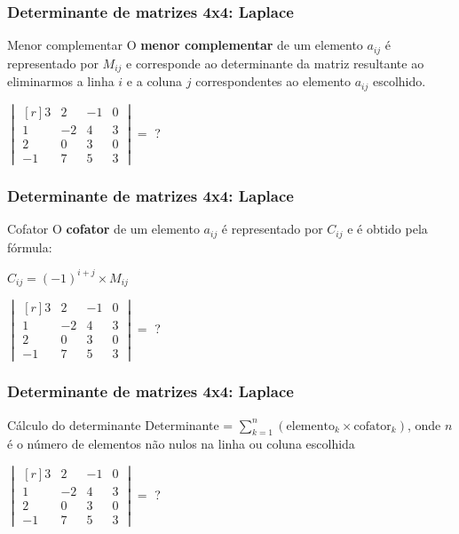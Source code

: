 \documentclass[pdftex, brazil, aspectratio=169]{beamer}
\begin{document}
\begin{frame}[t]
  \frametitle{Determinante de matrizes 4x4: Laplace}
  \begin{block}{Menor complementar}
    O \textbf{menor complementar} de um elemento $a_{ij}$ é representado por
    $M_{ij}$ e corresponde ao determinante da matriz resultante ao eliminarmos 
    a linha $i$ e a coluna $j$ correspondentes ao elemento $a_{ij}$ escolhido.
  \end{block}
  $\begin{vmatrix*}[r]
    3 & 2 & -1 & 0\\
    1 & -2 & 4 & 3\\
    2 & 0 & 3 & 0\\
    -1 & 7 & 5 & 3\end{vmatrix*} =$ ?
\end{frame}

\begin{frame}[t]
  \frametitle{Determinante de matrizes 4x4: Laplace}
  \begin{block}{Cofator}
    O \textbf{cofator} de um elemento $a_{ij}$ é representado por
    $C_{ij}$ e é obtido pela fórmula:
  \begin{center}
    $C_{ij} = (-1)^{i+j} \times M_{ij}$
  \end{center}
  \end{block}
  $\begin{vmatrix*}[r]
    3 & 2 & -1 & 0\\
    1 & -2 & 4 & 3\\
    2 & 0 & 3 & 0\\
    -1 & 7 & 5 & 3\end{vmatrix*} =$ ?
\end{frame}

\begin{frame}[t]
  \frametitle{Determinante de matrizes 4x4: Laplace}
  \begin{block}{Cálculo do determinante}
    Determinante = $\displaystyle \sum_{k=1}^n (\text{elemento}_k \times \text{cofator}_k)$,
        onde $n$ é o número de elementos não nulos na linha ou coluna escolhida
  \end{block}
  $\begin{vmatrix*}[r]
    3 & 2 & -1 & 0\\
    1 & -2 & 4 & 3\\
    2 & 0 & 3 & 0\\
    -1 & 7 & 5 & 3\end{vmatrix*} =$ ?
\end{frame}
\end{document}
